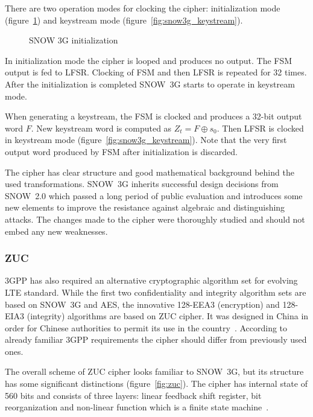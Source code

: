 There are two operation modes for clocking the cipher: initialization mode
(figure~\ref{fig:snow3g_init}) and keystream mode
(figure~\ref{fig:snow3g_keystream}). 
\begin{figure}[htbp]
    \centering
    
    \caption{SNOW 3G initialization}
    \label{fig:snow3g_init}
\end{figure}
In initialization mode the cipher is looped and produces no output. The FSM
output is fed to LFSR. Clocking of FSM and then LFSR is repeated for 32 times.
After the initialization is completed SNOW~3G starts to operate in keystream
mode.

When generating a keystream, the FSM is clocked and produces a 32-bit output
word $F$. New keystream word is computed as $Z_t = F \oplus s_0$. Then LFSR is
clocked in keystream mode (figure~\ref{fig:snow3g_keystream}). Note that the
very first output word produced by FSM after initialization is discarded.

The cipher has clear structure and good mathematical background behind the used
transformations. SNOW~3G inherits successful design decisions from SNOW~2.0
which passed a long period of public evaluation and introduces some new elements
to improve the resistance against algebraic and distinguishing attacks. The
changes made to the cipher were thoroughly studied and should not embed any new
weaknesses.

\subsubsection{ZUC}

3GPP has also required an alternative cryptographic algorithm set for evolving
LTE standard. While the first two confidentiality and integrity
algorithm sets are based on SNOW~3G and AES, the innovative 128-EEA3
(encryption) and 128-EIA3 (integrity) algorithms are based on ZUC cipher. It was
designed in China in order for Chinese authorities to permit its use in the
country~\cite{3gpp:eea3_doc4}. According to already familiar 3GPP requirements the cipher should
differ from previously used ones.

The overall scheme of ZUC cipher looks familiar to SNOW~3G, but its structure
has some significant distinctions (figure~\ref{fig:zuc}). The cipher has
internal state of 560 bits and consists of three layers: linear feedback shift
register, bit reorganization and non-linear function which is a finite state
machine~\cite{3gpp:eea3_doc2}.

